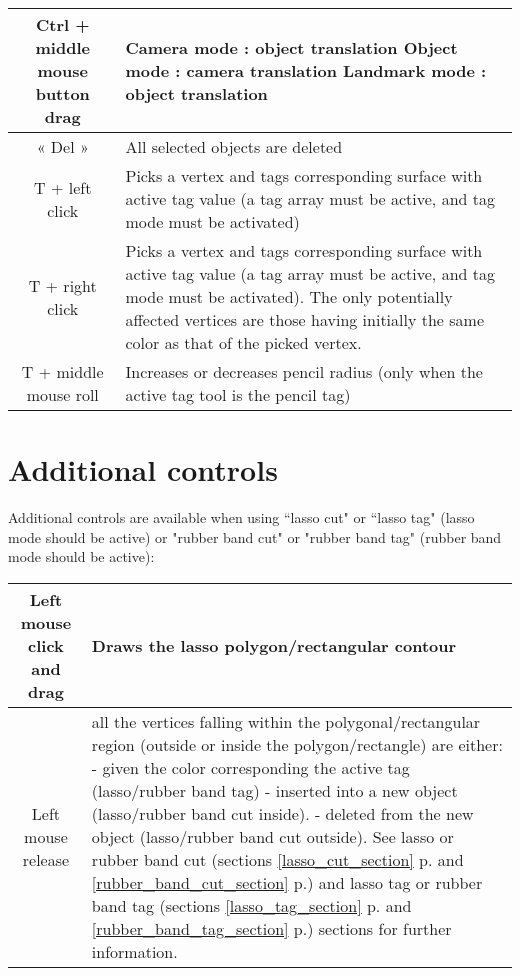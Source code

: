 \begin{tabularx}{\linewidth}{ | c | X | }
Ctrl + middle mouse button drag 
& Camera mode : object translation\newline
Object mode : camera translation\newline
Landmark mode : object translation \\ \hline			

« Del » & All selected objects are deleted \\ \hline			

T + left click & Picks a vertex and tags corresponding surface with active tag value (a tag array must be active, and tag mode must be activated)  \\ \hline			
 
T + right click & Picks a vertex and tags corresponding surface with active tag value (a tag array must be active, and tag mode must be activated). The only potentially affected vertices are those having initially the same color as that of the picked vertex.   \\ \hline			

T + middle mouse roll & Increases or decreases pencil radius (only when the active tag tool is the pencil tag)  \\ \hline			

 \end{tabularx}

\section{Additional controls}
Additional controls are available when using ``lasso cut" or ``lasso tag" (lasso mode should be active) or "rubber band cut" or "rubber band tag" (rubber band mode should be active):\\
\begin{tabularx}{\linewidth}{ | c | X | }
\hline			
Left mouse click and drag & Draws the lasso polygon/rectangular contour\\ \hline			

Left mouse release &  all the vertices falling within the polygonal/rectangular region (outside or inside the polygon/rectangle) are either:\newline
- given the color corresponding the active tag (lasso/rubber band tag)\newline
- inserted into a new object (lasso/rubber band cut inside).\newline 
- deleted from the new object (lasso/rubber band cut outside).\newline 
See lasso or rubber band cut (sections \ref{lasso_cut_section} p.\pageref{lasso_cut_section} and \ref{rubber_band_cut_section} p.\pageref{rubber_band_cut_section}) and lasso tag or rubber band tag (sections \ref{lasso_tag_section} p.\pageref{lasso_tag_section} and \ref{rubber_band_tag_section} p.\pageref{rubber_band_tag_section}) sections for further information.\\ \hline	
		

\end{tabularx}

